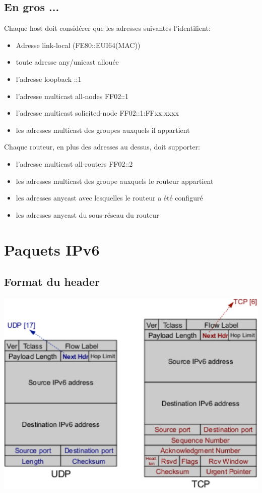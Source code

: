 \documentclass{report}
\begin{document}
\subsection{En gros ...}

Chaque host doit considérer que les adresses suivantes l'identifient:

\begin{itemize}
\item Adresse link-local (FE80::EUI64(MAC))
\item toute adresse any/unicast allouée
\item l'adresse loopback ::1
\item l'adresse multicast all-nodes FF02::1
\item l'adresse multicast solicited-node FF02::1:FFxx:xxxx
\item les adresses multicast des groupes auxquels il appartient
\end{itemize}

Chaque routeur, en plus des adresses au dessus, doit supporter:

\begin{itemize}
\item l'adresse multicast all-routers FF02::2
\item les adresses multicast des groupe auxquels le routeur appartient
\item les adresses anycast avec lesquelles le routeur a été configuré
\item les adresses anycast du sous-réseau du routeur
\end{itemize}

\section{Paquets IPv6}

\subsection{Format du header}

\includegraphics[width=\textwidth]{ipv6format.eps}
\end{document}
